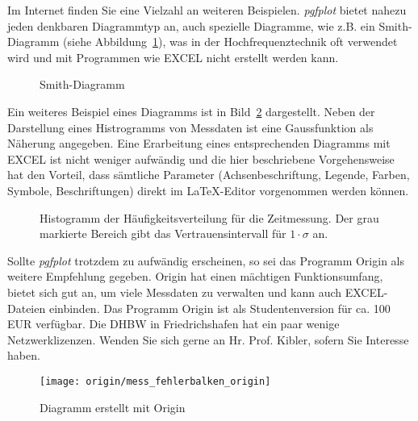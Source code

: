 Im Internet finden Sie eine Vielzahl an weiteren Beispielen. \textit{pgfplot} bietet nahezu jeden denkbaren Diagrammtyp an, auch spezielle Diagramme, wie z.B. ein Smith-Diagramm (siehe Abbildung~\ref{fig:smith}), was in der Hochfrequenztechnik oft verwendet wird und mit Programmen wie EXCEL nicht erstellt werden kann.

\begin{figure}[hbt]
	\centering
\caption[Smith-Diagramm]{Smith-Diagramm}
\label{fig:smith}
\end{figure}

Ein weiteres Beispiel eines Diagramms ist in Bild~\ref{fig:historamm} dargestellt. Neben der Darstellung eines Histrogramms von Messdaten ist eine Gaussfunktion als Näherung angegeben. Eine Erarbeitung eines entsprechenden Diagramms mit EXCEL ist nicht weniger aufwändig und die hier beschriebene Vorgehensweise hat den Vorteil, dass sämtliche Parameter (Achsenbeschriftung, Legende, Farben, Symbole, Beschriftungen) direkt im \LaTeX-Editor vorgenommen werden können.

\begin{figure}[hbt]
	\centering
	
	\caption[Histogramm der Häufigkeitsverteilung für eine Zeitmessung]{Histogramm der Häufigkeitsverteilung für die Zeitmessung. Der grau markierte Bereich gibt das Vertrauensintervall für $1 \cdot \sigma $ an.}
	\label{fig:historamm}
\end{figure}

Sollte \textit{pgfplot} trotzdem zu aufwändig erscheinen, so sei das Programm Origin als weitere Empfehlung gegeben. Origin hat einen mächtigen Funktionsumfang, bietet sich gut an, um viele Messdaten zu verwalten und kann auch EXCEL-Dateien einbinden. Das Programm Origin ist als Studentenversion für ca. 100 EUR verfügbar. Die DHBW in Friedrichshafen hat ein paar wenige Netzwerklizenzen. Wenden Sie sich gerne an Hr. Prof. Kibler, sofern Sie Interesse haben.


\begin{figure}[hbt]
	\centering
	\texttt{[image: origin/mess\_fehlerbalken\_origin]}
	\caption{Diagramm erstellt mit Origin}
	\label{fig:origin}
\end{figure}

